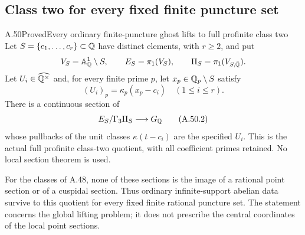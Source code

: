 \subsection{Class two for every fixed finite puncture set}

\begin{statement}{A.50}{Proved}{Every ordinary finite-puncture ghost lifts to full profinite class two}
Let $S=\{c_1,\ldots,c_r\}\subset\mathbb Q$ have distinct elements, with
$r\ge2$, and put
\[
 V_S=\mathbb A^1_\mathbb Q\setminus S,\qquad
 E_S=\pi_1(V_S),\qquad \Pi_S=\pi_1(V_{S,\bar{\mathbb Q}}).
\]
Let $U_i\in\widehat{\mathbb Q^\times}$ and, for every finite prime $p$,
let $x_p\in\mathbb Q_p\setminus S$ satisfy
\[
                (U_i)_p=\kappa_p(x_p-c_i)\quad(1\le i\le r).
\tag{A.50.1}
\]
There is a continuous section of
\[
 E_S/\Gamma_3\Pi_S\longrightarrow G_\mathbb Q
\tag{A.50.2}
\]
whose pullbacks of the unit classes $\kappa(t-c_i)$ are the
specified $U_i$.  This is the actual full profinite class-two
quotient, with all coefficient primes retained.  No local
section theorem is used.

For the classes of A.48, none of these sections is the image
of a rational point section or of a cuspidal section.  Thus
ordinary infinite-support abelian data survive to this quotient
for every fixed finite rational puncture set.  The statement
concerns the global lifting problem; it does not prescribe
the central coordinates of the local point sections.
\end{statement}
